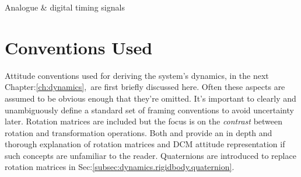 \begin{table}[h]
\centering
{}
\caption{Analogue \& digital timing signals}
\label{tab:servo}
\end{table}
\section{Conventions Used}
\label{sec:proto.conventions}
Attitude conventions used for deriving the system's dynamics, in the next Chapter:\ref{ch:dynamics},~are first briefly discussed here. Often these aspects are assumed to be obvious enough that they're omitted. It's important to clearly and unambiguously define a standard set of framing conventions to avoid uncertainty later. Rotation matrices are included but the focus is on the \emph{contrast} between rotation and transformation operations. Both \cite{spacecraftattitutdequaternions} and \cite{rigidbodylecture} provide an in depth and thorough explanation of rotation matrices and DCM attitude representation if such concepts are unfamiliar to the reader. Quaternions are introduced to replace rotation matrices in Sec:\ref{subsec:dynamics.rigidbody.quaternion}.
